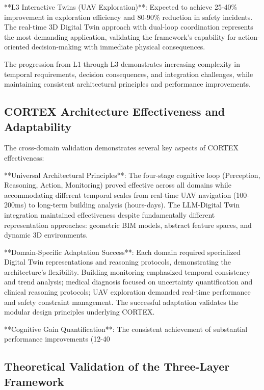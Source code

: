 **L3 Interactive Twins (UAV Exploration)**: Expected to achieve 25-40\% improvement in exploration efficiency and 80-90\% reduction in safety incidents. The real-time 3D Digital Twin approach with dual-loop coordination represents the most demanding application, validating the framework's capability for action-oriented decision-making with immediate physical consequences.

The progression from L1 through L3 demonstrates increasing complexity in temporal requirements, decision consequences, and integration challenges, while maintaining consistent architectural principles and performance improvements.

\subsection{CORTEX Architecture Effectiveness and Adaptability}

The cross-domain validation demonstrates several key aspects of CORTEX effectiveness:

**Universal Architectural Principles**: The four-stage cognitive loop (Perception, Reasoning, Action, Monitoring) proved effective across all domains while accommodating different temporal scales from real-time UAV navigation (100-200ms) to long-term building analysis (hours-days). The LLM-Digital Twin integration maintained effectiveness despite fundamentally different representation approaches: geometric BIM models, abstract feature spaces, and dynamic 3D environments.

**Domain-Specific Adaptation Success**: Each domain required specialized Digital Twin representations and reasoning protocols, demonstrating the architecture's flexibility. Building monitoring emphasized temporal consistency and trend analysis; medical diagnosis focused on uncertainty quantification and clinical reasoning protocols; UAV exploration demanded real-time performance and safety constraint management. The successful adaptation validates the modular design principles underlying CORTEX.

**Cognitive Gain Quantification**: The consistent achievement of substantial performance improvements (12-40%

\subsection{Theoretical Validation of the Three-Layer Framework}

